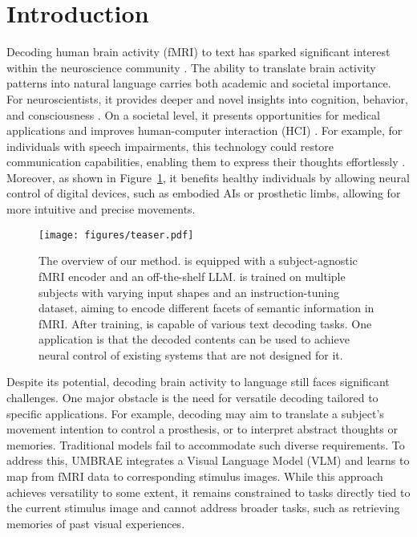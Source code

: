 \section{Introduction}
Decoding human brain activity (fMRI) to text has sparked significant interest within the neuroscience community \cite{xia2024umbrae,chen2023mindgpt,luo2023brainscuba,hmamouche2024multimodal}. The ability to translate brain activity patterns into natural language carries both academic and societal importance. For neuroscientists, it provides deeper and novel insights into cognition, behavior, and consciousness \cite{qiu2023learning,luo2023brainscuba}. On a societal level, it presents opportunities for medical applications and improves human-computer interaction (HCI) \cite{bernal2022brain,du2022fmri}. For example, for individuals with speech impairments, this technology could restore communication capabilities, enabling them to express their thoughts effortlessly \cite{card2024accurate}. Moreover, as shown in Figure~\ref{fig:teaser}, it benefits healthy individuals by allowing neural control of digital devices, such as embodied AIs or prosthetic limbs, allowing for more intuitive and precise movements.

\begin{figure}
    \centering
    \texttt{[image: figures/teaser.pdf]}
    \vspace{-2em}
    \caption{The overview of our method. \name{} is equipped with a subject-agnostic fMRI encoder and an off-the-shelf LLM. \name{} is trained on multiple subjects with varying input shapes and an instruction-tuning dataset, aiming to encode different facets of semantic information in fMRI. After training, \name{} is capable of various text decoding tasks. One application is that the decoded contents can be used to achieve neural control of existing systems that are not designed for it.}
    \label{fig:teaser}
    \vspace{-1.5em}
\end{figure}


Despite its potential, decoding brain activity to language still faces significant challenges. One major obstacle is the need for versatile decoding tailored to specific applications. For example, decoding may aim to translate a subject's movement intention to control a prosthesis, or to interpret abstract thoughts or memories. Traditional models fail to accommodate such diverse requirements. To address this, UMBRAE \cite{xia2024umbrae} integrates a Visual Language Model (VLM) \cite{chen2023shikra} 
 and learns to map from fMRI data to corresponding stimulus images. While this approach achieves versatility to some extent, it remains constrained to tasks directly tied to the current stimulus image and cannot address broader tasks, such as retrieving memories of past visual experiences.

